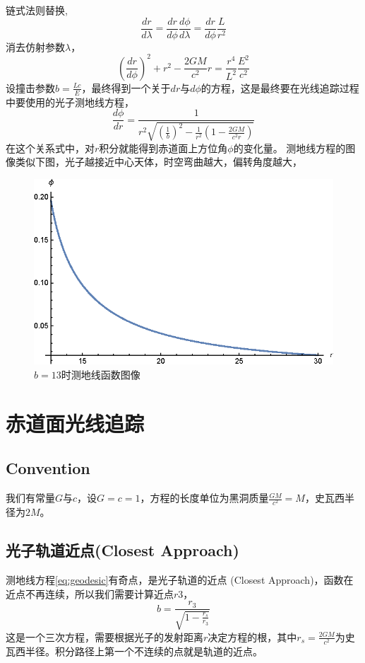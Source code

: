 链式法则替换,
\begin{equation}
    \frac{dr}{d\lambda}=\frac{dr}{d\phi}\frac{d\phi}{d\lambda}=\frac{dr}{d\phi}\frac{L}{r^{2}}
\end{equation}
消去仿射参数$\lambda$，
\begin{equation}
    \left(\frac{dr}{d\phi}\right)^{2}+r^{2}-\frac{2GM}{c^{2}}r=\frac{r^{4}}{L^{2}}\frac{E^{2}}{c^{2}}
\end{equation}
设撞击参数$b=\frac{Lc}{E}$，最终得到一个关于$dr$与$d\phi$的方程，这是最终要在光线追踪过程中要使用的光子测地线方程，
\begin{equation}
    \frac{d\phi}{dr}=\frac{1}{r^{2}\sqrt{\left(\frac{1}{b}\right)^{2}-\frac{1}{r^{2}}\left(1-\frac{2GM}{c^{2}r}\right)}}\label{eq:geodesic}
\end{equation}
在这个关系式中，对$r$积分就能得到赤道面上方位角$\phi$的变化量。
测地线方程的图像类似下图，光子越接近中心天体，时空弯曲越大，偏转角度越大，
\begin{figure}[htbp]
    \centering
    \includegraphics{images/geodesic.eps}
    \caption{$b=13$时测地线函数图像}\label{fig:geodesic} %
\end{figure}

\section{赤道面光线追踪}
\subsection{Convention}
我们有常量$G$与$c$，设$G=c=1$，方程的长度单位为黑洞质量$\frac{GM}{c^2}=M$，史瓦西半径为$2M$。

\subsection{光子轨道近点(Closest Approach)}
测地线方程\eqref{eq:geodesic}有奇点，是光子轨道的近点 (Closest Approach)，函数在近点不再连续，所以我们需要计算近点$r3$，
\begin{equation}
    b=\frac{r_3}{\sqrt{1-\frac{r_s}{r_3}}}\label{eq:r3}
\end{equation}
这是一个三次方程，需要根据光子的发射距离$r$决定方程的根，其中$r_s=\frac{2GM}{c^2}$为史瓦西半径。积分路径上第一个不连续的点就是轨道的近点。

